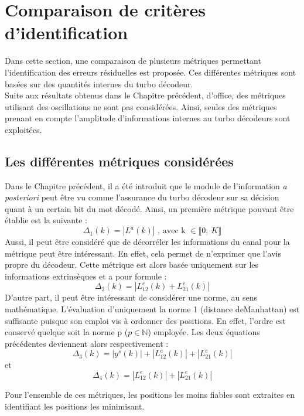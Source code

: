 \section{Comparaison de critères d'identification}
Dans cette section, une comparaison de plusieurs métriques permettant l'identification des erreurs résiduelles est 
proposée. Ces différentes métriques sont basées sur des quantités internes du turbo décodeur.\\
Suite aux résultats obtenus dans le Chapitre précédent, d'office, des métriques utilisant des oscillations ne sont 
pas considérées. Ainsi, seules des métriques prenant en compte l'amplitude d'informations internes au turbo décodeurs 
sont exploitées.

\subsection{Les différentes métriques considérées}
Dans le Chapitre précédent, il a été introduit que le module de l'information \textit{a posteriori} peut être vu comme 
l'assurance du turbo décodeur sur sa décision quant à un certain bit du mot décodé. Ainsi, un première métrique pouvant 
être établie est la suivante :
\begin{equation}
	\Delta_1(k) = |L^a(k)|\text{~, avec k~}\in \llbracket0;~K \rrbracket 
\end{equation}
Aussi, il peut être considéré que de décorréler les informations du canal pour la métrique peut être intéressant. En effet, 
cela permet de n'exprimer que l'avis propre du décodeur. Cette métrique est alors basée uniquement sur les informations 
extrinsèques et a pour formule : 
\begin{equation}
	\Delta_2(k) = |L^e_{12}(k)+L^e_{21}(k)|
\end{equation}
D'autre part, il peut être intéressant de considérer une norme, au sens mathématique. L'évaluation d'uniquement la norme 1 
(distance deManhattan) est suffisante puisque son emploi vis à ordonner des positions. En effet, l'ordre est 
conservé quelque soit la norme p ($p \in \mathbb{N} $) employée. Les deux équations précédentes deviennent alors 
respectivement :
\begin{equation}
	\Delta_3(k) = |y^s(k)| + |L^e_{12}(k)| + |L^e_{21}(k)|
\end{equation}
et 
\begin{equation}
	\Delta_4(k) = |L^e_{12}(k)| + |L^e_{21}(k)|
\end{equation}

Pour l'ensemble de ces métriques, les positions les moins fiables sont extraites en identifiant les positions les 
minimisant.

